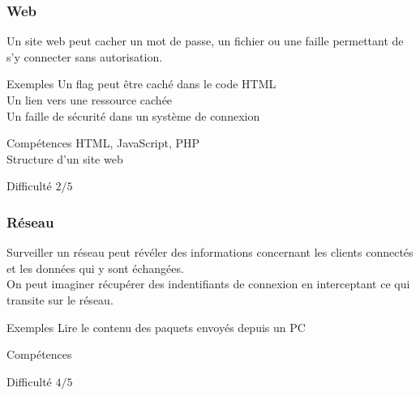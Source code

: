 \documentclass{beamer}
\begin{document}
\begin{frame}
\frametitle{Web}

Un site web peut cacher un mot de passe, un fichier ou une faille permettant de s'y connecter sans autorisation.

\begin{block}{Exemples}
    Un flag peut être caché dans le code HTML \\
    Un lien vers une ressource cachée \\
    Un faille de sécurité dans un système de connexion
\end{block}

\begin{block}{Compétences}
    HTML, JavaScript, PHP \\
    Structure d'un site web
\end{block}

\begin{block}{Difficulté}
    $2/5$
\end{block}

\end{frame}


\begin{frame}
\frametitle{Réseau}

Surveiller un réseau peut révéler des informations concernant les clients connectés et les données qui y sont échangées. \\
On peut imaginer récupérer des indentifiants de connexion en interceptant ce qui transite sur le réseau. 

\begin{block}{Exemples}
    Lire le contenu des paquets envoyés depuis un PC \\
\end{block}

\begin{block}{Compétences}

\end{block}

\begin{block}{Difficulté}
    $4/5$
\end{block}

\end{frame}

\end{document}
